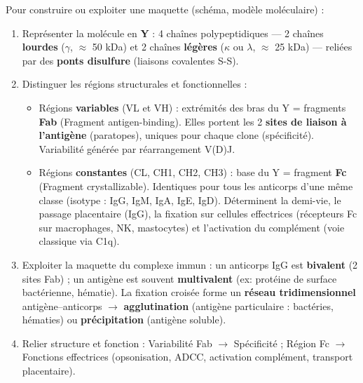 \documentclass[11pt]{article}
\newcommand{\cle}[1]{{\popxbold\color{popdark}#1}}
\begin{document}
\begin{methode}
Pour construire ou exploiter une maquette (schéma, modèle moléculaire) :
\begin{enumerate}
\item \cle{Représenter} la molécule en \textbf{Y} : 4 chaînes polypeptidiques — 2 chaînes \textbf{lourdes} ($\gamma$, $\approx$ 50 kDa) et 2 chaînes \textbf{légères} ($\kappa$ ou $\lambda$, $\approx$ 25 kDa) — reliées par des \textbf{ponts disulfure} (liaisons covalentes S-S).
\item \cle{Distinguer} les régions structurales et fonctionnelles :
\begin{itemize}
\item Régions \textbf{variables} (VL et VH) : extrémités des bras du Y = fragments \textbf{Fab} (Fragment antigen-binding). Elles portent les 2 \textbf{sites de liaison à l'antigène} (paratopes), uniques pour chaque clone (spécificité). Variabilité générée par réarrangement V(D)J.
\item Régions \textbf{constantes} (CL, CH1, CH2, CH3) : base du Y = fragment \textbf{Fc} (Fragment crystallizable). Identiques pour tous les anticorps d'une même classe (isotype : IgG, IgM, IgA, IgE, IgD). Déterminent la demi-vie, le passage placentaire (IgG), la fixation sur cellules effectrices (récepteurs Fc sur macrophages, NK, mastocytes) et l'activation du complément (voie classique via C1q).
\end{itemize}
\item \cle{Exploiter} la maquette du complexe immun : un anticorps IgG est \textbf{bivalent} (2 sites Fab) ; un antigène est souvent \textbf{multivalent} (ex: protéine de surface bactérienne, hématie). La fixation croisée forme un \textbf{réseau tridimensionnel} antigène--anticorps $\rightarrow$ \textbf{agglutination} (antigène particulaire : bactéries, hématies) ou \textbf{précipitation} (antigène soluble).
\item \cle{Relier} structure et fonction : Variabilité Fab $\rightarrow$ Spécificité ; Région Fc $\rightarrow$ Fonctions effectrices (opsonisation, ADCC, activation complément, transport placentaire).
\end{enumerate}
\end{methode}
\end{document}
